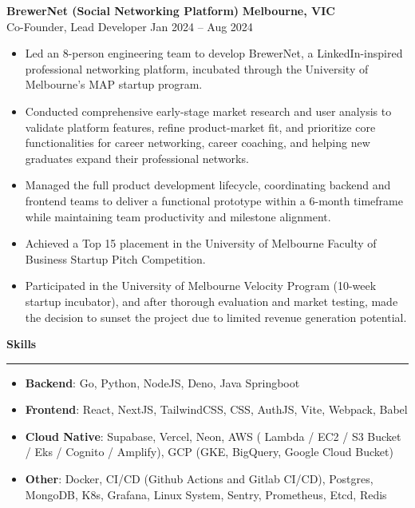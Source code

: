 \documentclass[11pt, letterpaper]{article}
\newcommand{\cvsection}[1]{
	\vspace{0.5em}
	\noindent\textbf{#1}\\[-0.5em] 
	\rule{\textwidth}{0.5pt}
	\vspace{0.5em}
}
\begin{document}
\noindent\scriptsize \textbf{BrewerNet (Social Networking Platform)} \hfill \textbf{Melbourne, VIC} \\
\scriptsize {Co-Founder, Lead Developer} \hfill Jan 2024 -- Aug 2024
\vspace{-0.5em}
\begin{itemize}
    \setlength\itemsep{-0.2em}
    \setlength\leftskip{-2em}
    \setlength{}
    \setlength\itemindent{0em}
    \item Led an 8-person engineering team to develop BrewerNet, a LinkedIn-inspired professional networking platform, incubated through the University of Melbourne's MAP startup program.
    \item Conducted comprehensive early-stage market research and user analysis to validate platform features, refine product-market fit, and prioritize core functionalities for career networking, career coaching, and helping new graduates expand their professional networks.
    \item Managed the full product development lifecycle, coordinating backend and frontend teams to deliver a functional prototype within a 6-month timeframe while maintaining team productivity and milestone alignment.
    \item Achieved a Top 15 placement in the University of Melbourne Faculty of Business Startup Pitch Competition.
    \item Participated in the University of Melbourne Velocity Program (10-week startup incubator), and after thorough evaluation and market testing, made the decision to sunset the project due to limited revenue generation potential.
\end{itemize}
\vspace{0.5em}

\cvsection{Skills}
\vspace{-2em}
\begin{itemize}
    \setlength\itemsep{-0.2em}
    \setlength\leftskip{-2em}
    \setlength{}
    \setlength\itemindent{0em}  
 	\item \scriptsize \textbf{Backend}: Go, Python, NodeJS, Deno, Java Springboot
 	\item \scriptsize \textbf{Frontend}: React, NextJS, TailwindCSS, CSS, AuthJS, Vite, Webpack, Babel
 	\item \scriptsize \textbf{Cloud Native}: Supabase, Vercel, Neon, AWS ( Lambda / EC2 / S3 Bucket / Eks / Cognito / Amplify), GCP (GKE, BigQuery, Google Cloud Bucket)
   	\item \scriptsize \textbf{Other}: Docker, CI/CD (Github Actions and Gitlab CI/CD), Postgres, MongoDB, K8s, Grafana, Linux System, Sentry, Prometheus, Etcd, Redis
\end{itemize}
\vspace{0.5em}
\end{document}
